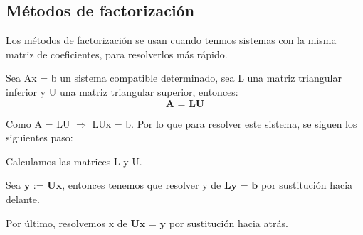 		\subsection{Métodos de factorización}
		Los métodos de factorización se usan cuando tenmos sistemas con la misma matriz de coeficientes, para resolverlos más rápido.
		
			\begin{ndef}[Factorización LU]
			Sea Ax = b un sistema compatible determinado, sea L una matriz triangular inferior y U una matriz triangular superior, entonces:
			\[ \textbf{A = LU} \]
			\end{ndef}

		Como A = LU $\Rightarrow$ LUx = b. Por lo que para resolver este sistema, se siguen los siguientes paso:
		
			\begin{nlist}
			\item Calculamos las matrices L y U.
			\item Sea $\textbf{y := Ux}$, entonces tenemos que resolver y de $\textbf{Ly = b}$ por sustitución hacia delante.
			\item Por último, resolvemos x de $\textbf{Ux = y}$ por sustitución hacia atrás.
			\end{nlist}
			
